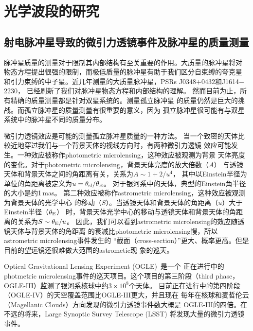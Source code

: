 
\chapter{光学波段的研究}

\section{射电脉冲星导致的微引力透镜事件及脉冲星的质量测量}

脉冲星质量的测量对于限制其内部结构有至关重要的作用。大质量的脉冲星将对
物态方程提出很强的限制，而极低质量的脉冲星有助于我们区分自束缚的夸克星
和引力束缚的中子星。近几年测量的大质量脉冲星，PSRs J0348$+$0432和J1614$-$2230，
已经刷新了我们对脉冲星物态方程和内部结构的理解\supercite{Anton,Demorest,Ozel2010,Lai2011}。
%
然而目前为止，所有精确的质量测量都是针对双星系统的。测量孤立脉冲星
的质量仍然是巨大的挑战。而孤立脉冲星的质量测量有很重要的意义，因为
孤立脉冲星很可能有与双星系统中的脉冲星不同的质量分布。

微引力透镜效应是可能的测量孤立脉冲星质量的一种方法\supercite{Dai,Schwarz02,Horvath96}。
当一个致密的天体比较近地穿过我们与一个背景天体的视线方向时，有两种微引力透镜
效应可能发生。一种效应被称作photometric microlensing，这种效应被观测为背景
天体亮度的变化。对于photometric microlensing，背景天体亮度的放大倍数（$A$）
与透镜天体和背景天体之间的角距离有关，关系为$A\sim 1+2/u^{4}$\supercite{mao}，
其中以Einstein半径为单位的角距离被定义为$u=\theta_{\rm{sl}}/\theta_{\rm{E}}$。
对于银河系中的天体，典型的Einstein角半径的大小是约1\,mas。
%
第二种效应被称作astrometric microlensing，这种效应被观测为背景天体的光学中心
的移动（$S$）。当透镜天体和背景天体的角距离（$u$）大于Einstein半径（$\theta_{\rm{E}}$）
时，背景天体光学中心的移动与透镜天体和背景天体的角距离的关系为$S \sim \theta_{\rm{E}}/u$\supercite{Bel}。
因此，我们可以看到astrometric microlensing的效应随透镜天体与背景天体的角距离
的衰减比photometric microlensing慢，所以astrometric microlensing事件发生的
“截面（cross-section）”更大、概率更高。但是目前的望远镜还很难做大范围的astrometic现
象的巡天。

Optical Gravitational Lensing Experiment (OGLE)~\supercite{Udalski}是一个
正在进行中的photmetric microlensing事件的巡天项目。这个项目的第三阶段（third phase，
OGLE-III）监测了银河系核球中约$3\times10^{8}$个天体\supercite{Szymanski}。
目前正在进行中的第四阶段（OGLE-IV）的天空覆盖范围比OGLE-III更大，并且现在
每年在核球和麦哲伦云（Magellanic Clouds）方向发现的微引力透镜事件数大概是
OGLE-III的四倍。在不远的将来，Large Synoptic Survey Telescope (LSST)\supercite{lsst}
将发现大量的微引力透镜事件。

